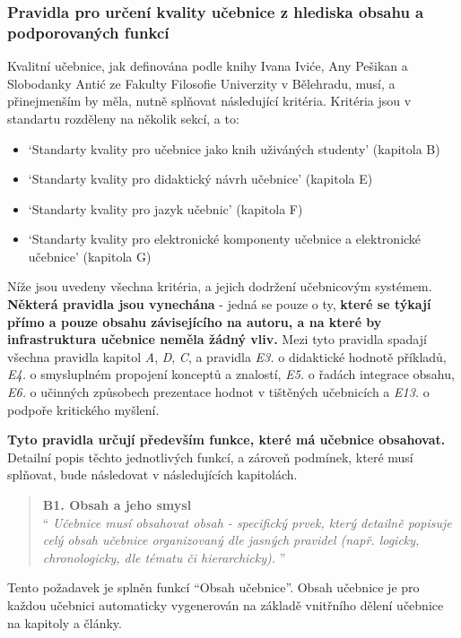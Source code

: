 \documentclass[12pt]{article}
\begin{document}
\subsubsection{Pravidla pro určení kvality učebnice z hlediska obsahu a podporovaných funkcí}
Kvalitní učebnice, jak definována podle knihy Ivana Iviće, Any Pešikan a Slobodanky Antić ze Fakulty Filosofie Univerzity v Bělehradu, \cite{Standard} musí, a přinejmenším by měla, nutně splňovat následující kritéria. Kritéria jsou v standartu rozděleny na několik sekcí, a to:
\begin{itemize}
	\item{} \enquote*{Standarty kvality pro učebnice jako knih uživáných studenty} (kapitola B)
	\item{} \enquote*{Standarty kvality pro didaktický návrh učebnice} (kapitola E)
	\item{} \enquote*{Standarty kvality pro jazyk učebnic} (kapitola F)
	\item{} \enquote*{Standarty kvality pro elektronické komponenty učebnice a elektronické učebnice} (kapitola G)
\end{itemize}

Níže jsou uvedeny všechna kritéria, a jejich dodržení učebnicovým systémem. \textbf{Některá pravidla jsou vynechána} - jedná se pouze o ty, \textbf{které se týkají přímo a pouze obsahu závisejícího na autoru, a na které by infrastruktura učebnice neměla žádný vliv.} Mezi tyto pravidla spadají všechna pravidla kapitol \textit{A}, \textit{D}, \textit{C}, a pravidla \textit{E3.} o didaktické hodnotě příkladů,  \textit{E4.} o smysluplném propojení konceptů a znalostí, \textit{E5.} o řadách integrace obsahu, \textit{E6.} o učinných způsobech prezentace hodnot v tištěných učebnicích a \textit{E13.} o podpoře kritického myšlení.

\textbf{Tyto pravidla určují především funkce, které má učebnice obsahovat.} Detailní popis těchto jednotlivých funkcí, a zároveň podmínek, které musí splňovat, bude následovat v následujících kapitolách.


\begin{samepage}
	\begin{quotation}
		\textbf{B1. Obsah a jeho smysl} \\
		\enquote{\textit{
				Učebnice musí obsahovat obsah - specifický prvek, který detailně popisuje celý obsah učebnice organizovaný dle jasných pravidel (např. logicky, chronologicky, dle tématu či hierarchicky).
		}}
	\end{quotation}

	Tento požadavek je splněn funkcí \enquote{Obsah učebnice}. Obsah učebnice je pro každou učebnici automaticky vygenerován na základě vnitřního dělení učebnice na kapitoly a články.
\end{samepage}
\end{document}

